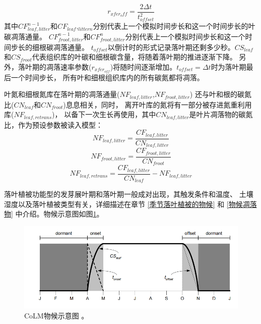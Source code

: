 \begin{enumerate}
\begin{equation}
\end{equation}
\begin{equation}
r_{xfer_{o} f f}=\frac{2 \Delta t}{t_{offset}^{2}}
\end{equation}
其中$CF_{leaf,litter}^{n-1}$和$CF_{leaf}$,$_{littern}$分别代表上一个模拟时间步长和这一个时间步长的叶碳凋落通量。
$CF_{froot,litter}^{n-1}$和$CF_{froot,litter}^n$分别代表上一个模拟时间步长和这一个时间步长的细根碳凋落通量。
$t_{offset}$以倒计时的形式记录落叶期还剩多少秒。$CS_{leaf}$和$CS_{froot}$代表组织库的叶碳和细根碳含量，将随着落叶期的推进逐渐下降。
另外，落叶期的凋落速率参数($r_{{xfer}_{off}}$)将随时间逐渐增加。$t_{offset}=\Delta t$时为落叶期最后一个时间步长，
所有叶和细根组织库内的所有碳氮都将凋落。

叶氮和细根氮库在落叶期的凋落通量($NF_{leaf,litter}$,$NF_{froot,litter}$)
还与叶和根的碳氮比($CN_{leaf}$和$CN_{froot}$)息息相关，同时，
离开叶库的氮将有一部分被存进氮重利用库($NF_{leaf,retrans}$)，
以备下一次生长再使用，其中$CN_{leaf,litter}$是叶片凋落物的碳氮比，作为预设参数被读入模型：
\begin{equation}
N F_{leaf,litter}=\frac{CF_{leaf,litter}}{CN_{leaf,litter}}
\end{equation}
\begin{equation}
N F_{froot,litter}=\frac{CF_{froot,litter}}{CN_{froot}}
\end{equation}
\begin{equation}
N F_{leaf, retrans}=\frac{CF_{leaf,litter}}{CN_{leaf}}-NF_{leaf,litter}
\end{equation}

落叶植被功能型的发芽展叶期和落叶期一般成对出现，其触发条件和温度、
土壤湿度以及落叶植被类型有关，详细描述在章节 \ref{季节落叶植被的物候} 和 \ref{物候凋落物} 中介绍。物候示意图如图\ref{fig:CoLM物候示意图}。\\

{
\begin{figure}[]
\centering
\includegraphics{Figures/植被生物地球化学循环过程/CoLM物候示意图.png}
\caption{CoLM物候示意图 \citep{lawrence2018}。 }
\label{fig:CoLM物候示意图}
\end{figure}
}


\end{enumerate}
